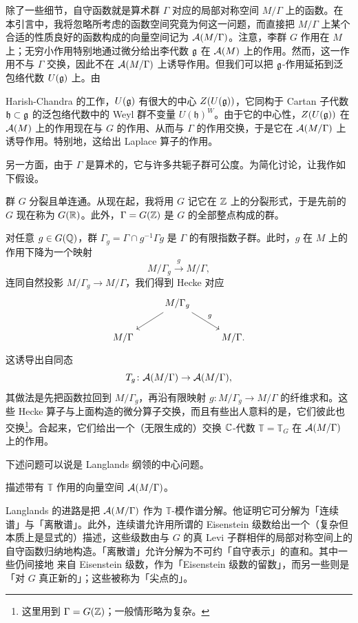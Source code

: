 除了一些细节，自守函数就是算术群 $\Gamma$ 对应的局部对称空间 $M/\Gamma$ 上的函数。在本引言中，我将忽略所考虑的函数空间究竟为何这一问题，而直接把 $M/\Gamma$ 上某个合适的性质良好的函数构成的向量空间记为 $\mathcal{A}(M/\Gamma)$。注意，李群 $G$ 作用在 $M$ 上；无穷小作用特别地通过微分给出李代数 $\mathfrak{g}$ 在 $\mathcal{A}(M)$ 上的作用。然而，这一作用不与 $\Gamma$ 交换，因此不在 $\mathcal{A}(M/\Gamma)$ 上诱导作用。但我们可以把 $\mathfrak{g}$-作用延拓到泛包络代数 $U(\mathfrak{g})$ 上。由

Harish-Chandra 的工作，$U(\mathfrak{g})$ 有很大的中心 $Z(U(\mathfrak{g}))$，它同构于 Cartan 子代数 $\mathfrak{h}\subset\mathfrak{g}$ 的泛包络代数中的 Weyl 群不变量 $U(\mathfrak{h})^W$。由于它的中心性，$Z(U(\mathfrak{g}))$ 在 $\mathcal{A}(M)$ 上的作用现在与 $G$ 的作用、从而与 $\Gamma$ 的作用交换，于是它在 $\mathcal{A}(M/\Gamma)$ 上诱导作用。特别地，这给出 Laplace 算子的作用。

另一方面，由于 $\Gamma$ 是算术的，它与许多共轭子群可公度。为简化讨论，让我作如下假设。

\begin{assumption}
群 $G$ 分裂且单连通。从现在起，我将用 $G$ 记它在 $\mathbb{Z}$ 上的分裂形式，于是先前的 $G$ 现在称为 $G(\mathbb{R})$。此外，$\Gamma=G(\mathbb{Z})$ 是 $G$ 的全部整点构成的群。
\end{assumption}

对任意 $g\in G(\mathbb{Q})$，群 $\Gamma_g=\Gamma\cap g^{-1}\Gamma g$ 是 $\Gamma$ 的有限指数子群。此时，$g$ 在 $M$ 上的作用下降为一个映射
\[ M/\Gamma_g\xrightarrow{g}M/\Gamma, \]
连同自然投影 $M/\Gamma_g\to M/\Gamma$，我们得到 Hecke 对应
\[ \begin{tikzcd} & M/\Gamma_g \arrow[dl] \arrow[dr, "g"] & \\ M/\Gamma & & M/\Gamma. \end{tikzcd} \]
这诱导出自同态
\[ T_g\colon\mathcal{A}(M/\Gamma)\to\mathcal{A}(M/\Gamma), \]
其做法是先把函数拉回到 $M/\Gamma_g$，再沿有限映射 $g\colon M/\Gamma_g\to M/\Gamma$ 的纤维求和。这些 Hecke 算子与上面构造的微分算子交换，而且有些出人意料的是，它们彼此也交换\footnote{这里用到 $\Gamma=G(\mathbb{Z})$；一般情形略为复杂。}。合起来，它们给出一个（无限生成的）交换 $\mathbb{C}$-代数 $\mathbb{T}=\mathbb{T}_G$ 在 $\mathcal{A}(M/\Gamma)$ 上的作用。

下述问题可以说是 Langlands 纲领的中心问题。

\begin{problem}
描述带有 $\mathbb{T}$ 作用的向量空间 $\mathcal{A}(M/\Gamma)$。
\end{problem}

Langlands 的进路是把 $\mathcal{A}(M/\Gamma)$ 作为 $\mathbb{T}$-模作谱分解。他证明它可分解为「连续谱」与「离散谱」。此外，连续谱允许用所谓的 Eisenstein 级数给出一个（复杂但本质上是显式的）描述，这些级数由与 $G$ 的真 Levi 子群相伴的局部对称空间上的自守函数归纳地构造。「离散谱」允许分解为不可约「自守表示」的直和。其中一些仍间接地 来自 Eisenstein 级数，作为「Eisenstein 级数的留数」，而另一些则是「对 $G$ 真正新的」；这些被称为「尖点的」。

